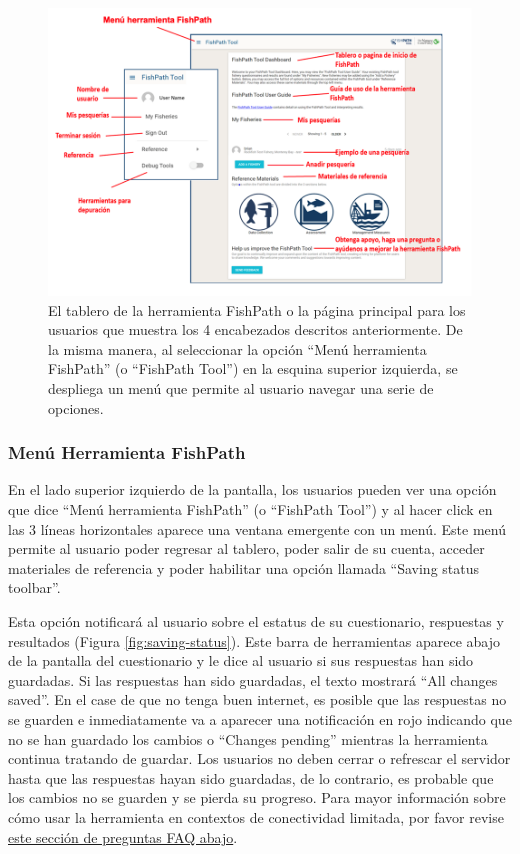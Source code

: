 \documentclass[
  11pt,
]{book}
\begin{document}
\begin{figure}

{\centering \includegraphics[width=0.95\linewidth]{images/user-dashboard-es} 

}

\caption{El tablero de la herramienta FishPath o la página principal para los usuarios que muestra los 4 encabezados descritos anteriormente. De la misma manera, al seleccionar la opción “Menú herramienta FishPath” (o “FishPath Tool”) en la esquina superior izquierda, se despliega un menú que permite al usuario navegar una serie de opciones.}\label{fig:dashboard}
\end{figure}

\hypertarget{menuxfa-herramienta-fishpath}{%
\subsubsection{Menú Herramienta FishPath}\label{menuxfa-herramienta-fishpath}}

En el lado superior izquierdo de la pantalla, los usuarios pueden ver una opción que dice ``Menú herramienta FishPath'' (o ``FishPath Tool'') y al hacer click en las 3 líneas horizontales aparece una ventana emergente con un menú. Este menú permite al usuario poder regresar al tablero, poder salir de su cuenta, acceder materiales de referencia y poder habilitar una opción llamada ``Saving status toolbar''.

Esta opción notificará al usuario sobre el estatus de su cuestionario, respuestas y resultados (Figura \ref{fig:saving-status}). Este barra de herramientas aparece abajo de la pantalla del cuestionario y le dice al usuario si sus respuestas han sido guardadas. Si las respuestas han sido guardadas, el texto mostrará ``All changes saved''. En el case de que no tenga buen internet, es posible que las respuestas no se guarden e inmediatamente va a aparecer una notificación en rojo indicando que no se han guardado los cambios o ``Changes pending'' mientras la herramienta continua tratando de guardar. Los usuarios no deben cerrar o refrescar el servidor hasta que las respuestas hayan sido guardadas, de lo contrario, es probable que los cambios no se guarden y se pierda su progreso. Para mayor información sobre cómo usar la herramienta en contextos de conectividad limitada, por favor revise \protect\hyperlink{faq-internet}{este sección de preguntas FAQ abajo}.
\end{document}
